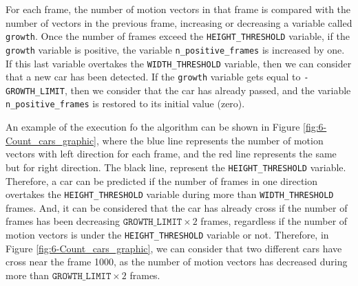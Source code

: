 For each frame, the number of motion vectors in that frame is compared with the number of vectors in the previous frame, increasing or decreasing a variable called \texttt{growth}. Once the number of frames exceed the \texttt{HEIGHT\_THRESHOLD} variable, if the \texttt{growth} variable is positive, the variable \texttt{n\_positive\_frames} is increased by one. If this last variable overtakes the \texttt{WIDTH\_THRESHOLD} variable, then we can consider that a new car has been detected. If the \texttt{growth} variable gets equal to \texttt{-GROWTH\_LIMIT}, then we consider that the car has already passed, and the variable \texttt{n\_positive\_frames} is restored to its initial value (zero).

An example of the execution fo the algorithm can be shown in Figure \ref{fig:6-Count_cars_graphic}, where the blue line represents the number of motion vectors with left direction for each frame, and the red line represents the same but for right direction. The black line, represent the \texttt{HEIGHT\_THRESHOLD} variable. Therefore, a car can be predicted if the number of frames in one direction overtakes the \texttt{HEIGHT\_THRESHOLD} variable during more than \texttt{WIDTH\_THRESHOLD} frames. And, it can be considered that the car has already cross if the number of frames has been decreasing $\texttt{GROWTH\_LIMIT} \times 2 $ frames, regardless if the number of motion vectors is under the \texttt{HEIGHT\_THRESHOLD} variable or not. Therefore, in Figure \ref{fig:6-Count_cars_graphic}, we can consider that two different cars have cross near the frame 1000, as the number of motion vectors has decreased during more than $\texttt{GROWTH\_LIMIT} \times 2 $ frames.

